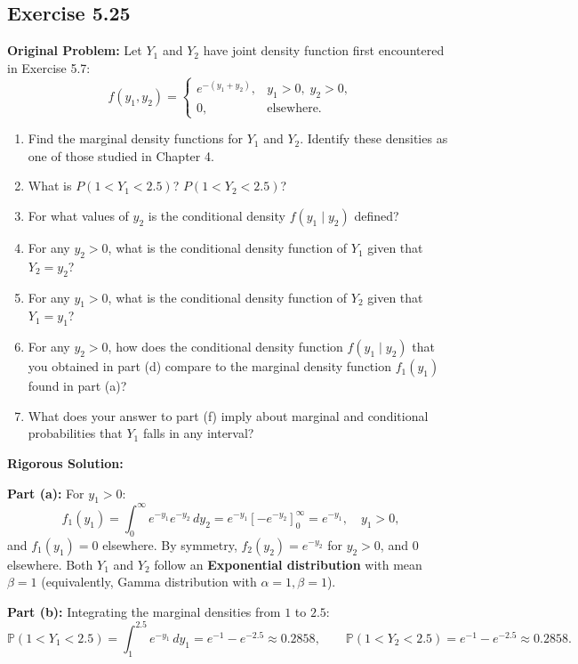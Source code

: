 \documentclass[11pt, letterpaper]{article}
\theoremstyle{definition}
\theoremstyle{remark}
\newcommand{\Prob}{\mathbb{P}}
\begin{document}
\subsection{Exercise 5.25}

\textbf{Original Problem:}
Let $Y_1$ and $Y_2$ have joint density function first encountered in Exercise 5.7:
\[ f(y_1, y_2) = \begin{cases} e^{-(y_1+y_2)}, & y_1 > 0, \; y_2 > 0, \\ 0, & \text{elsewhere.} \end{cases} \]
\begin{enumerate}[label=\textbf{\alph*}]
    \item Find the marginal density functions for $Y_1$ and $Y_2$. Identify these densities as one of those studied in Chapter 4.
    \item What is $P(1 < Y_1 < 2.5)$? $P(1 < Y_2 < 2.5)$?
    \item For what values of $y_2$ is the conditional density $f(y_1 \mid y_2)$ defined?
    \item For any $y_2 > 0$, what is the conditional density function of $Y_1$ given that $Y_2 = y_2$?
    \item For any $y_1 > 0$, what is the conditional density function of $Y_2$ given that $Y_1 = y_1$?
    \item For any $y_2 > 0$, how does the conditional density function $f(y_1 \mid y_2)$ that you obtained in part (d) compare to the marginal density function $f_1(y_1)$ found in part (a)?
    \item What does your answer to part (f) imply about marginal and conditional probabilities that $Y_1$ falls in any interval?
\end{enumerate}

\textbf{Rigorous Solution:}

\textbf{Part (a):} For $y_1 > 0$:
\[ f_1(y_1) = \int_0^\infty e^{-y_1} e^{-y_2} \, dy_2 = e^{-y_1} \left[ -e^{-y_2} \right]_0^\infty = e^{-y_1}, \quad y_1 > 0, \]
and $f_1(y_1) = 0$ elsewhere. By symmetry, $f_2(y_2) = e^{-y_2}$ for $y_2 > 0$, and $0$ elsewhere. Both $Y_1$ and $Y_2$ follow an \textbf{Exponential distribution} with mean $\beta = 1$ (equivalently, Gamma distribution with $\alpha = 1, \beta = 1$).

\textbf{Part (b):} Integrating the marginal densities from $1$ to $2.5$:
\[ \Prob(1 < Y_1 < 2.5) = \int_1^{2.5} e^{-y_1} \, dy_1 = e^{-1} - e^{-2.5} \approx 0.2858, \qquad \Prob(1 < Y_2 < 2.5) = e^{-1} - e^{-2.5} \approx 0.2858. \]
\end{document}
